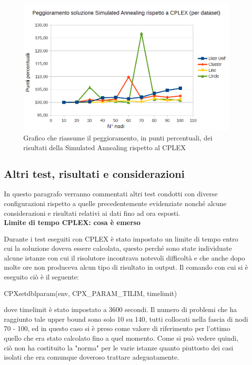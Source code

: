 \documentclass[preprint,12pt]{elsarticle}
\begin{document}
\begin{figure}[htbp]
\centering
\includegraphics[scale=0.50]{grafici_confronti/peggioramento_SA.png} 
\caption{Grafico che riassume il peggioramento, in punti percentuali, dei risultati della Simulated Annealing rispetto al CPLEX}\label{fig:10}
\end{figure}

\subsection{\textbf{Altri test, risultati e considerazioni}}

In questo paragrafo verranno commentati altri test condotti con diverse configurazioni rispetto a quelle precedentemente evidenziate nonché alcune considerazioni e risultati relativi ai dati fino ad ora esposti. \\

{\large \textbf{Limite di tempo CPLEX: cosa è emerso}}

Durante i test eseguiti con CPLEX è stato impostato un limite di tempo entro cui la soluzione doveva essere calcolata, questo perché sono state individuate alcune istanze con cui il risolutore incontrava notevoli difficoltà e che anche dopo molte ore non produceva alcun tipo di risultato in output. Il comando con cui si è eseguito ciò è il seguente:

\begin{center}
CPXsetdblparam(env, CPX\_PARAM\_TILIM, timelimit)
\end{center}
dove timelimit è stato impostato a 3600 secondi. Il numero di problemi che ha raggiunto tale upper bound sono solo 10 su 140, tutti collocati nella fascia di nodi 70 - 100, ed in questo caso si è preso come valore di riferimento per l'ottimo quello che era stato calcolato fino a quel momento. Come si può vedere quindi, ciò non ha costituito la "norma" per le varie istanze quanto piuttosto dei casi isolati che era comunque doveroso trattare adeguatamente.\\
\end{document}
